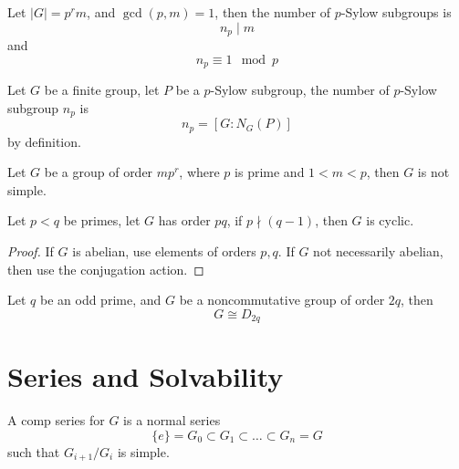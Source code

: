 \documentclass[openany]{book}
\begin{document}
\begin{thm}
    Let $|G|=p^rm$, and $\gcd(p,m)=1$, then the number of $p$-Sylow subgroups is 
    \begin{equation*}
        n_p\mid m 
    \end{equation*}
    and 
    \begin{equation*}
        n_p\equiv 1\mod p
    \end{equation*}
\end{thm}
\begin{prop}
    Let $G$ be a finite group, let $P$ be a $p$-Sylow subgroup, the number of $p$-Sylow subgroup $n_p$ is
    \begin{equation*}
        n_p=[G:N_G(P)]
    \end{equation*}
    by definition.
\end{prop}

\begin{prop}
    Let $G$ be a group of order $mp^r$, where $p$ is prime and $1<m<p$, then $G$ is not simple.
\end{prop}


\begin{prop}[*]
    Let $p<q$ be primes, let $G$ has order $pq$, if $p\nmid (q-1)$, then $G$ is cyclic.
\end{prop}
\begin{proof}
    If $G$ is abelian, use elements of orders $p,q$. If $G$ not necessarily abelian, then use the conjugation action.
\end{proof}

\begin{prop}[*]
    Let $q$ be an odd prime, and $G$ be a noncommutative group of order $2q$, then 
    \begin{equation*}
        G\cong D_{2q}
    \end{equation*}
\end{prop}

\section{Series and Solvability}
\begin{defn}
    A comp series for $G$ is a normal series
    \begin{equation*}
        \{e\}=G_0\subset G_1\subset \dots\subset G_n=G
    \end{equation*}
    such that $G_{i+1}/G_i$ is simple.
\end{defn}
\end{document}
